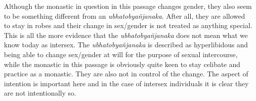 Although the monastic in question in this passage changes gender, they also seem to be something different from an {\em ubhatob­yañ­janaka}. After all, they are allowed to stay in robes and their change in sex/gender is not treated as anything special. This is all the more evidence that the {\em ubhatob­yañ­janaka} does not mean what we know today as intersex. The {\em ubhatob­yañ­janaka} is described as hyperlibidous and being able to change sex/gender at will for the purpose of sexual intercourse, while the monastic in this passage is obviously quite keen to stay celibate and practice as a monastic. They are also not in control of the change. The aspect of intention is important here and in the case of intersex individuals it is clear they are not intentionally so.
